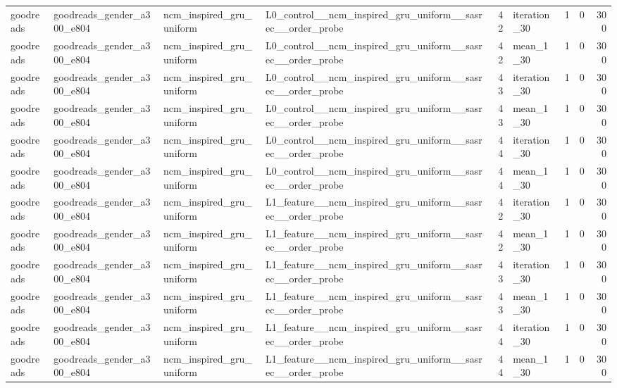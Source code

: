 \begin{table}[htbp!]
\begin{tabular}{llllrlrrr}
goodreads & goodreads\_gender\_a300\_e804 & ncm\_inspired\_gru\_uniform & L0\_control\_\_ncm\_inspired\_gru\_uniform\_\_sasrec\_\_order\_probe & 42 & iteration\_30 & 1 & 0 & 300 \\
goodreads & goodreads\_gender\_a300\_e804 & ncm\_inspired\_gru\_uniform & L0\_control\_\_ncm\_inspired\_gru\_uniform\_\_sasrec\_\_order\_probe & 42 & mean\_1\_30 & 1 & 0 & 300 \\
goodreads & goodreads\_gender\_a300\_e804 & ncm\_inspired\_gru\_uniform & L0\_control\_\_ncm\_inspired\_gru\_uniform\_\_sasrec\_\_order\_probe & 43 & iteration\_30 & 1 & 0 & 300 \\
goodreads & goodreads\_gender\_a300\_e804 & ncm\_inspired\_gru\_uniform & L0\_control\_\_ncm\_inspired\_gru\_uniform\_\_sasrec\_\_order\_probe & 43 & mean\_1\_30 & 1 & 0 & 300 \\
goodreads & goodreads\_gender\_a300\_e804 & ncm\_inspired\_gru\_uniform & L0\_control\_\_ncm\_inspired\_gru\_uniform\_\_sasrec\_\_order\_probe & 44 & iteration\_30 & 1 & 0 & 300 \\
goodreads & goodreads\_gender\_a300\_e804 & ncm\_inspired\_gru\_uniform & L0\_control\_\_ncm\_inspired\_gru\_uniform\_\_sasrec\_\_order\_probe & 44 & mean\_1\_30 & 1 & 0 & 300 \\
goodreads & goodreads\_gender\_a300\_e804 & ncm\_inspired\_gru\_uniform & L1\_feature\_\_ncm\_inspired\_gru\_uniform\_\_sasrec\_\_order\_probe & 42 & iteration\_30 & 1 & 0 & 300 \\
goodreads & goodreads\_gender\_a300\_e804 & ncm\_inspired\_gru\_uniform & L1\_feature\_\_ncm\_inspired\_gru\_uniform\_\_sasrec\_\_order\_probe & 42 & mean\_1\_30 & 1 & 0 & 300 \\
goodreads & goodreads\_gender\_a300\_e804 & ncm\_inspired\_gru\_uniform & L1\_feature\_\_ncm\_inspired\_gru\_uniform\_\_sasrec\_\_order\_probe & 43 & iteration\_30 & 1 & 0 & 300 \\
goodreads & goodreads\_gender\_a300\_e804 & ncm\_inspired\_gru\_uniform & L1\_feature\_\_ncm\_inspired\_gru\_uniform\_\_sasrec\_\_order\_probe & 43 & mean\_1\_30 & 1 & 0 & 300 \\
goodreads & goodreads\_gender\_a300\_e804 & ncm\_inspired\_gru\_uniform & L1\_feature\_\_ncm\_inspired\_gru\_uniform\_\_sasrec\_\_order\_probe & 44 & iteration\_30 & 1 & 0 & 300 \\
goodreads & goodreads\_gender\_a300\_e804 & ncm\_inspired\_gru\_uniform & L1\_feature\_\_ncm\_inspired\_gru\_uniform\_\_sasrec\_\_order\_probe & 44 & mean\_1\_30 & 1 & 0 & 300 \\

\end{tabular}
\end{table}
